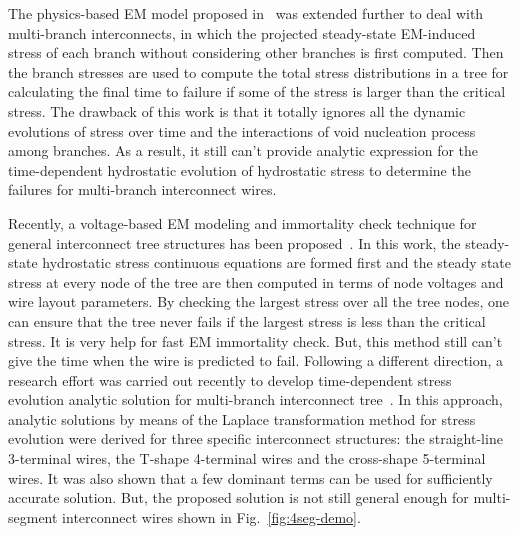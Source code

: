 The physics-based EM model proposed
in~\cite{HuangYu:DAC'14,HuangTan:TCAD'16} was extended further to deal
with multi-branch interconnects, in which the projected steady-state
EM-induced stress of each branch without considering other branches is
first computed. Then the branch stresses are used to compute the total
stress distributions in a tree for calculating the final time to
failure if some of the stress is larger than the critical stress. The
drawback of this work is that it totally ignores all the dynamic
evolutions of stress over time and the interactions of void nucleation
process among branches. As a result, it still can't provide analytic
expression for the time-dependent hydrostatic evolution of hydrostatic
stress to determine the failures for multi-branch interconnect wires.

Recently, a voltage-based EM modeling and immortality check technique
for general interconnect tree structures has been
proposed~\cite{SunDemircan:ICCAD'16}. In this work, the steady-state
hydrostatic stress continuous equations are formed first and the
steady state stress at every node of the tree are then computed in
terms of node voltages and wire layout parameters. By checking the
largest stress over all the tree nodes, one can ensure that the tree
never fails if the largest stress is less than the critical stress. It
is very help for fast EM immortality check. But, this method still
can't give the time when the wire is predicted to fail. Following a
different direction, a research effort was carried out recently to
develop time-dependent stress evolution analytic solution for
multi-branch interconnect
tree~\cite{ChenHuang:DAC'15,ChenTan:TCAD'16}.  In this approach,
analytic solutions by means of the Laplace transformation method for
stress evolution were derived for three specific interconnect
structures: the straight-line 3-terminal wires, the T-shape 4-terminal
wires and the cross-shape 5-terminal wires. It was also shown that a
few dominant terms can be used for sufficiently accurate
solution. But, the proposed solution is not still general enough for
multi-segment interconnect wires shown in Fig.~\ref{fig:4seg-demo}.




